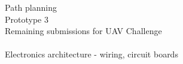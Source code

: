 Path planning\\

Prototype 3\\

Remaining submissions for UAV Challenge\\

\\

Electronics architecture - wiring, circuit boards\\